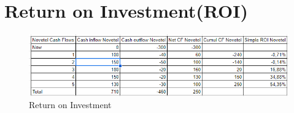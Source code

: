 \section{Return on Investment(ROI)}
\begin{figure}[H]
        \includegraphics[width=\textwidth]{img/ROI.png}
        \caption{Return on Investment }
        \label{fig: ROI }
    \end{figure}

